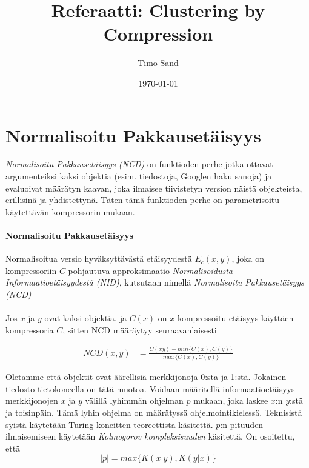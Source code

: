 \documentclass[finnish]{tktltiki2}
\title{Referaatti: Clustering by Compression}
\author{Timo Sand}
\date{\today}
\theoremstyle{definition}
\theoremstyle{remark}
\begin{document}

\frontmatter      %

\maketitle        %



\mainmatter       %

\section{Normalisoitu Pakkausetäisyys} %
\label{sec:normalisoitu_pakkauset_isyys}

  \emph{Normalisoitu Pakkausetäisyys (NCD)} on funktioden perhe jotka ottavat argumenteiksi kaksi objektia (esim. tiedostoja, Googlen haku sanoja) ja evaluoivat määrätyn kaavan, joka ilmaisee tiivistetyn version näistä objekteista, erillisinä ja yhdistettynä. Täten tämä funktioden perhe on parametrisoitu käytettävän kompressorin mukaan.

  \paragraph{Normalisoitu Pakkausetäisyys} %
  \label{par:normalisoitu_pakkauset_isyys}

    Normalisoitua versio hyväksyttävästä etäisyydestä $E_c(x,y)$, joka on kompressoriin $C$ pohjautuva approksimaatio \emph{Normalisoidusta Informaatioetäisyydestä (NID)}, kutsutaan nimellä \emph{Normalisoitu Pakkausetäisyys (NCD)} \cite{CV05}
  \\\\
    Jos $x$ ja $y$ ovat kaksi objektia, ja $C(x)$ on $x$ kompressoitu etäisyys  käyttäen kompressoria $C$, sitten NCD määräytyy seuraavanlaisesti

    \begin{align*}
      NCD(x,y) &= \frac{C(xy)-min\{C(x),C(y)\}}{max\{C(x),C(y)\}}
    \end{align*}

    Oletamme että objektit ovat äärellisiä merkkijonoja 0:sta ja 1:stä. Jokainen tiedosto tietokoneella on tätä muotoa. Voidaan määritellä informaatioetäisyys merkkijonojen $x$ ja $y$ välillä lyhimmän ohjelman $p$ mukaan, joka laskee $x$:n $y$:stä ja toisinpäin. Tämä lyhin ohjelma on määrätyssä ohjelmointikielessä. Teknisistä syistä käytetään Turing koneitten teoreettista käsitettä.
    $p$:n pituuden ilmaisemiseen käytetään \emph{Kolmogorov kompleksisuuden} käsitettä. On osoitettu, että
    $$|p| = max\{K(x|y),K(y|x)\}$$
\end{document}
